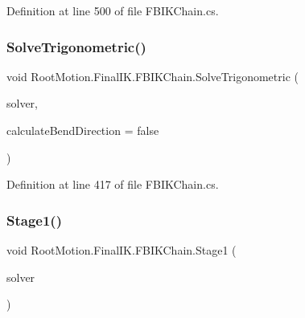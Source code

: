 Definition at line 500 of file F\+B\+I\+K\+Chain.\+cs.

\mbox{\label{class_root_motion_1_1_final_i_k_1_1_f_b_i_k_chain_a02a04f84e5fc0c66cda70ffc7207ba2b}} 
\subsubsection{\texorpdfstring{Solve\+Trigonometric()}{SolveTrigonometric()}}
{\footnotesize\ttfamily void Root\+Motion.\+Final\+I\+K.\+F\+B\+I\+K\+Chain.\+Solve\+Trigonometric (\begin{DoxyParamCaption}\item[{\mbox{\hyperlink{class_root_motion_1_1_final_i_k_1_1_i_k_solver_full_body}{I\+K\+Solver\+Full\+Body}}}]{solver,  }\item[{bool}]{calculate\+Bend\+Direction = {\ttfamily false} }\end{DoxyParamCaption})}



Definition at line 417 of file F\+B\+I\+K\+Chain.\+cs.

\mbox{\label{class_root_motion_1_1_final_i_k_1_1_f_b_i_k_chain_a5d7b8f6e941cf4d392d6018d7a985add}} 
\subsubsection{\texorpdfstring{Stage1()}{Stage1()}}
{\footnotesize\ttfamily void Root\+Motion.\+Final\+I\+K.\+F\+B\+I\+K\+Chain.\+Stage1 (\begin{DoxyParamCaption}\item[{\mbox{\hyperlink{class_root_motion_1_1_final_i_k_1_1_i_k_solver_full_body}{I\+K\+Solver\+Full\+Body}}}]{solver }\end{DoxyParamCaption})}



